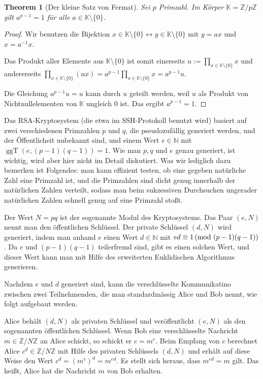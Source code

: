 \documentclass[
a4paper,12pt,
bibliography=totocnumbered,
numbers=noenddot,
]{scrartcl}
\numberwithin{equation}{subsection}
\newcommand{\N}{\mathbb N}
\newcommand{\Z}{\mathbb Z}
\newcommand{\K}{\mathbb K}
\newcommand{\ggT}{\operatorname{ggT}} %
\theoremstyle{plain}
\newtheorem*{thm}{Theorem}
\theoremstyle{definition}
\begin{document}
\begin{thm}[Der kleine Satz von Fermat] 
	Sei $p$ Primzahl. Im Körper $\K = \Z / p\Z$ gilt $a^{p-1} = 1$ für alle $a \in \K \setminus \{0\}$. 
\end{thm} 
\begin{proof}
Wir benutzen die Bijektion $x  \in \K \setminus \{0\}\leftrightarrow y \in \K \setminus \{0\}$ mit $y= ax$ und $x =a^{-1} x$. 
	
	
	Das Produkt aller Elemente aus $\K \setminus \{0\}$ ist somit einerseits $u:=\prod_{x \in \K \setminus \{0\} } x$ und andererseits $\prod_{x \in \K \setminus \{0\}} (a x) = a^{p-1} \prod_{x \in \K \setminus \{0\}} x = a^{p-1} u$.
	
	Die Gleichung $a^{p-1} u = u$ kann durch $u$ geteilt werden, weil $u$ als Produkt von Nichtnullelementen von $\K$ ungleich $0$ ist. Das ergibt $a^{p-1} = 1$.
\end{proof} 

	Das RSA-Kryptosystem (die etwa im SSH-Protokoll benutzt wird) basiert auf zwei verschiedenen Primzahlen $p$ und $q$, die pseudozufällig generiert werden, und der Öffentlicheit unbekannt sind, und einem Wert $e \in \N$ mit $\ggT(e,(p-1)(q-1))= 1$. Wie man $p, q$ und $e$ genau generiert, ist wichtig, wird aber hier nicht im Detail diskutiert.  Was wir lediglich dazu bemerken ist Folgendes: man kann effizient testen, ob eine gegeben natürliche Zahl eine Primzahl ist, und die Primzahlen sind dicht genug innerhalb der natürlichen Zahlen verteilt, sodass man beim sukzessiven Durchsuchen ungerader natürlichen Zahlen schnell genug auf eine Primzahl stoßt. 
	
	Der Wert $N = pq$ ist der sogenannte Modul des Kryptosystems. Das Paar $(e,N)$ nennt man den öffentlichen Schlüssel. Der private Schlüssel $(d,N)$ wird generiert, indem man anhand $e$ einen Wert $d \in \N$ mit $e d \equiv 1 \,(\mathrm{mod} \ (p-1)(q-1))$. Da $e$ und $(p-1)(q-1)$ teilerfremd sind, gibt es einen solchen Wert, und dieser Wert kann man mit Hilfe des erweiterten Euklidischen Algorithmus generieren. 
	
	Nachdem $e$ und $d$ generiert sind, kann die verschlüsselte Kommunikatino zwischen zwei Teilnehmenden, die man standardmässig Alice und Bob nennt, wie folgt aufgebaut werden. 
	
	Alice behält $(d,N)$ als privaten Schlüssel und veröffentlicht $(e,N)$ als den sogenannten öffentlichen Schlüssel. Wenn Bob eine  verschlüsselte Nachricht $m \in  \Z / N \Z$ an Alice schickt, so schickt er $c=m^e$.  Beim Empfang von $c$ berechnet Alice $c^d \in \Z / N \Z$ mit Hilfe des privaten Schlüssels $(d,N)$ und erhält auf diese Weise den Wert $c^d = (m^e)^d = m^{ed}$. Es stellt sich heraus, dass $m^{ed} = m$ gilt. Das heißt, Alice hat die Nachricht $m$ von Bob erhalten. 
	
\end{document}
